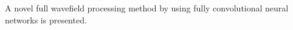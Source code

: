 A novel full wavefield processing method by using fully convolutional neural networks is presented.
